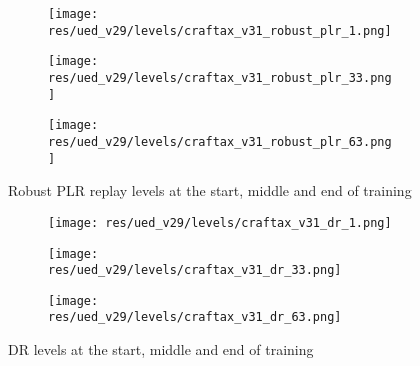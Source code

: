 \documentclass{article}
\theoremstyle{plain}
\theoremstyle{definition}
\theoremstyle{remark}
\begin{document}
\begin{figure}[H]
    \begin{minipage}{0.47\linewidth}
    \centering
    \begin{subfigure}[t]{0.3\linewidth}
        \texttt{[image: res/ued\_v29/levels/craftax\_v31\_robust\_plr\_1.png]}
    \end{subfigure}\hfill%
    \begin{subfigure}[t]{0.3\linewidth}
        \texttt{[image: res/ued\_v29/levels/craftax\_v31\_robust\_plr\_33.png]}
    \end{subfigure}\hfill%
    \begin{subfigure}[t]{0.3\linewidth}
        \texttt{[image: res/ued\_v29/levels/craftax\_v31\_robust\_plr\_63.png]}
    \end{subfigure}%
    \caption{Robust PLR replay levels at the start, middle and end of training}
    \label{fig:examples_robust_plr}
    \end{minipage}\hfill
    \begin{minipage}{0.47\linewidth}
    \centering
    \begin{subfigure}[t]{0.3\linewidth}
        \texttt{[image: res/ued\_v29/levels/craftax\_v31\_dr\_1.png]}
    \end{subfigure}\hfill%
    \begin{subfigure}[t]{0.3\linewidth}
        \texttt{[image: res/ued\_v29/levels/craftax\_v31\_dr\_33.png]}
    \end{subfigure}\hfill%
    \begin{subfigure}[t]{0.3\linewidth}
        \texttt{[image: res/ued\_v29/levels/craftax\_v31\_dr\_63.png]}
    \end{subfigure}%
    \caption{DR levels at the start, middle and end of training}
    \label{fig:examples_dr}
    \end{minipage}
\end{figure}
\end{document}
